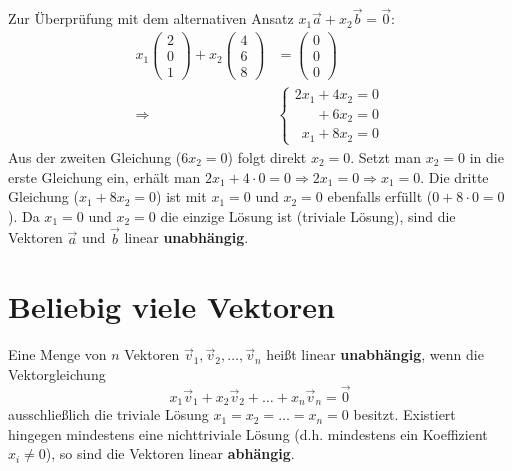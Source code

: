 Zur Überprüfung mit dem alternativen Ansatz $x_1 \vec{a} + x_2 \vec{b} = \vec{0}$:
\begin{align*}
    x_1 \begin{pmatrix} 2 \\ 0 \\ 1 \end{pmatrix} + x_2 \begin{pmatrix} 4 \\ 6 \\ 8 \end{pmatrix} &= \begin{pmatrix} 0 \\ 0 \\ 0 \end{pmatrix} \\
    \Rightarrow \quad & \begin{cases} 
        2x_1 + 4x_2 = 0 \\
        \phantom{0x_1} + 6x_2 = 0 \\
        \phantom{2}x_1 + 8x_2 = 0
    \end{cases}
\end{align*}
Aus der zweiten Gleichung ($6x_2 = 0$) folgt direkt $x_2 = 0$.
Setzt man $x_2 = 0$ in die erste Gleichung ein, erhält man $2x_1 + 4 \cdot 0 = 0 \Rightarrow 2x_1 = 0 \Rightarrow x_1 = 0$.
Die dritte Gleichung ($x_1 + 8x_2 = 0$) ist mit $x_1=0$ und $x_2=0$ ebenfalls erfüllt ($0 + 8 \cdot 0 = 0$).
Da $x_1=0$ und $x_2=0$ die einzige Lösung ist (triviale Lösung), sind die Vektoren $\vec{a}$ und $\vec{b}$ linear \textbf{unabhängig}.

\section{Beliebig viele Vektoren}

Eine Menge von $n$ Vektoren $\vec{v}_1, \vec{v}_2, \dots, \vec{v}_n$ heißt linear \textbf{unabhängig}, wenn die Vektorgleichung
\[
    x_1 \vec{v}_1 + x_2 \vec{v}_2 + \dots + x_n \vec{v}_n = \vec{0}
\]
ausschließlich die triviale Lösung $x_1 = x_2 = \dots = x_n = 0$ besitzt.
Existiert hingegen mindestens eine nichttriviale Lösung (d.h. mindestens ein Koeffizient $x_i \neq 0$), so sind die Vektoren linear \textbf{abhängig}.

